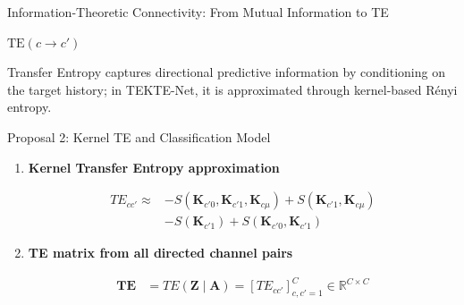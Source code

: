 \documentclass[aspectratio=169]{beamer}
\let\oldcite\cite
\renewcommand{\cite}[1]{{\tiny\oldcite{#1}}}
\begin{document}
\begin{frame}{Information-Theoretic Connectivity: From Mutual Information to TE}
\begin{center}
\begin{minipage}{0.18\textwidth}
{\tiny
$\mathrm{TE}(c\rightarrow c')$
}
\end{minipage}
\end{center}

\vspace{0.08cm}

{\centering
\color{frameblue}\footnotesize
Transfer Entropy captures directional predictive information by conditioning on the target history; in TEKTE-Net, it is approximated through kernel-based Rényi entropy.
\par}

\end{frame}

\begin{frame}{Proposal 2: Kernel TE and Classification Model}

\scriptsize
\setlength{\abovedisplayskip}{2pt}
\setlength{\belowdisplayskip}{2pt}
\setlength{\jot}{2pt}

\begin{enumerate}
\setlength{\itemsep}{0.08cm}

\item \textbf{Kernel Transfer Entropy approximation}
{\scriptsize \cite{schreiber2000measuring,yu2019multivariate}}

\begin{align*}
TE_{cc'}
\approx&
-
S
\left(
\mathbf{K}_{c'0},
\mathbf{K}_{c'1},
\mathbf{K}_{c\mu}
\right)
+
S
\left(
\mathbf{K}_{c'1},
\mathbf{K}_{c\mu}
\right)
\nonumber\\
&-
S
\left(
\mathbf{K}_{c'1}
\right)
+
S
\left(
\mathbf{K}_{c'0},
\mathbf{K}_{c'1}
\right)
\end{align*}

\item \textbf{TE matrix from all directed channel pairs}
{\scriptsize \cite{schreiber2000measuring}}

\begin{align*}
\mathbf{TE}
&=
TE(\mathbf{Z}\mid \mathbf{A})
=
\left[
TE_{cc'}
\right]_{c,c'=1}^{C}
\in
\mathbb{R}^{C\times C}
\end{align*}

\end{enumerate}

\vspace{0.08cm}


\end{frame}
\end{document}

